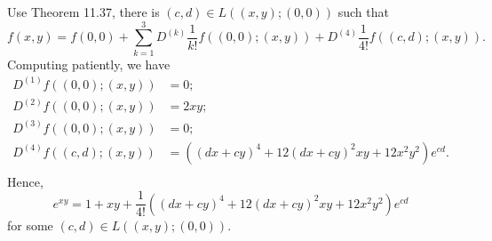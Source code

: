 \begin{Exercise}
\begin{enumerate}[a)]
\begin{solution}
Use Theorem 11.37, there is $(c,d)\in L\left( (x,y); (0,0) \right)$ such that
$$
f(x,y) = f(0,0) + \sum_{k=1}^{3} D^{(k)} \frac{1}{k!} f\left( (0,0);(x,y)\right) + D^{(4)}\frac{1}{4!}f\left( (c,d);(x,y)\right).
$$
Computing patiently, we have
\begin{align*}
D^{(1)} f\left( (0,0);(x,y)\right) &= 0; \\
D^{(2)} f\left( (0,0);(x,y)\right) &= 2 x y; \\
D^{(3)} f\left( (0,0);(x,y)\right) &= 0; \\
D^{(4)} f\left( (c,d);(x,y)\right) 
&=  \left( (d x+c y)^4 + 12(d x+c y)^2 x y + 12x^2 y^2 \right) e^{c d}.\\
\end{align*}
Hence,
$$
e^{x y} = 1+x y + \frac{1}{4!} \left( (d x+c y)^4 + 12(d x+c y)^2 x y + 12x^2 y^2 \right) e^{c d}
$$
for some $(c,d)\in L\left( (x,y);(0,0) \right)$.
\end{solution}
\end{enumerate}
\end{Exercise}